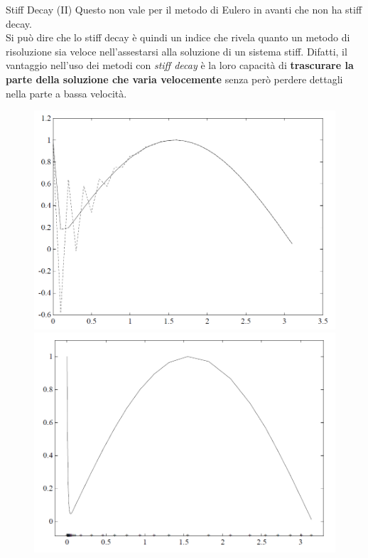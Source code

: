 \documentclass[aspectratio=169, 10pt, handout,usenames,dvipsnames]{beamer}
\begin{document}
    \begin{frame}{Stiff Decay (II)}
        Questo non vale per il metodo di Eulero in avanti che non ha stiff decay.\\
        \medskip
        \medskip
        Si può dire che lo stiff decay è quindi un \alert{indice} che rivela quanto un metodo di risoluzione sia veloce nell’assestarsi alla soluzione di un sistema stiff.
        Difatti, il vantaggio nell'uso dei metodi con \textit{stiff decay} è la loro capacità di \textbf{trascurare la parte della soluzione che varia velocemente} senza però perdere dettagli nella parte a bassa velocità.
        \begin{figure}
        \includegraphics[width=.4\linewidth]{fig8.png}
        \includegraphics[width=.4\linewidth]{fig9.png}
        \label{fig:my_label}
    \end{figure}
        
    \end{frame}
\end{document}
